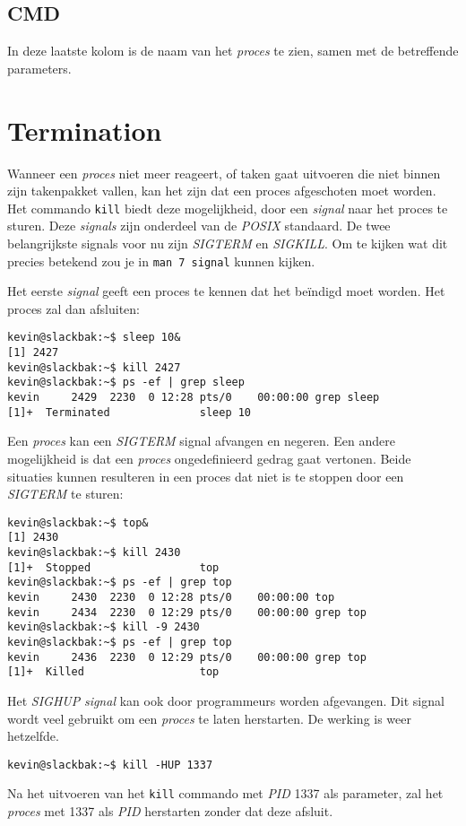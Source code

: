 \subsection{CMD}
In deze laatste kolom is de naam van het \emph{proces} te zien, samen met de betreffende parameters. 

\section{Termination} 
Wanneer een \emph{proces} niet meer reageert, of taken gaat uitvoeren die niet binnen zijn takenpakket vallen, kan het zijn dat een proces afgeschoten moet worden. Het commando \texttt{kill} biedt deze mogelijkheid, door een \emph{signal} naar het proces te sturen. Deze \emph{signals} zijn onderdeel van de \emph{POSIX} standaard. De twee belangrijkste signals voor nu zijn \emph{SIGTERM} en \emph{SIGKILL}. Om te kijken wat dit precies betekend zou je in \texttt{man 7 signal} kunnen kijken.

Het eerste \emph{signal} geeft een proces te kennen dat het be\"{i}ndigd moet worden. Het proces zal dan afsluiten: 
\begin{lstlisting}
kevin@slackbak:~$ sleep 10&
[1] 2427
kevin@slackbak:~$ kill 2427
kevin@slackbak:~$ ps -ef | grep sleep
kevin     2429  2230  0 12:28 pts/0    00:00:00 grep sleep
[1]+  Terminated              sleep 10
\end{lstlisting}%
Een \emph{proces} kan een \emph{SIGTERM} signal afvangen en negeren. Een andere mogelijkheid is dat een \emph{proces} ongedefinieerd gedrag gaat vertonen. Beide situaties kunnen resulteren in een proces dat niet is te stoppen door een \emph{SIGTERM} te sturen: 
\begin{lstlisting}
kevin@slackbak:~$ top&
[1] 2430
kevin@slackbak:~$ kill 2430
[1]+  Stopped                 top
kevin@slackbak:~$ ps -ef | grep top
kevin     2430  2230  0 12:28 pts/0    00:00:00 top
kevin     2434  2230  0 12:29 pts/0    00:00:00 grep top
kevin@slackbak:~$ kill -9 2430
kevin@slackbak:~$ ps -ef | grep top
kevin     2436  2230  0 12:29 pts/0    00:00:00 grep top
[1]+  Killed                  top
\end{lstlisting}%
Het \emph{SIGHUP} \emph{signal} kan ook door programmeurs worden afgevangen. Dit signal wordt veel gebruikt om een \emph{proces} te laten herstarten. De werking is weer hetzelfde. 
\begin{lstlisting}
kevin@slackbak:~$ kill -HUP 1337
\end{lstlisting}%
Na het uitvoeren van het \texttt{kill} commando met \emph{PID} 1337 als parameter, zal het \emph{proces} met 1337 als \emph{PID} herstarten zonder dat deze afsluit. 

